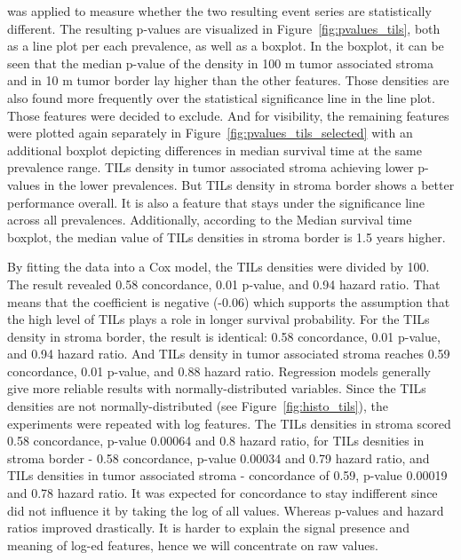 was applied to measure whether the two resulting event series are statistically different.
The resulting p-values are visualized in Figure~\ref{fig:pvalues_tils}, both as a line plot
per each prevalence, as well as a boxplot. In the boxplot, it can be seen that the median
p-value of the density in 100 \textmu m tumor associated stroma and in 10 \textmu m tumor
border lay higher than the other features. Those densities are also found more frequently
over the statistical significance line in the line plot. Those features were decided to exclude.
And for visibility, the remaining features were plotted again separately in
Figure~\ref{fig:pvalues_tils_selected} with an additional boxplot depicting differences in median
survival time at the same prevalence range. TILs density in tumor associated stroma achieving
lower p-values in the lower prevalences. But TILs density in stroma border shows a better
performance overall. It is also a feature that stays under the significance line across
all prevalences. Additionally, according to the Median survival time boxplot,
the median value of TILs densities in stroma border is 1.5 years higher.

By fitting the data into a Cox model, the TILs densities were divided by 100.
The result revealed 0.58 concordance, 0.01 p-value, and 0.94 hazard ratio.
That means that the coefficient is negative (-0.06) which supports the assumption
that the high level of TILs plays a role in longer survival probability.
For the TILs density in stroma border, the result is identical: 0.58 concordance,
0.01 p-value, and 0.94 hazard ratio. And TILs density in tumor associated stroma
reaches 0.59 concordance, 0.01 p-value, and 0.88 hazard ratio.
Regression models generally give more reliable results with normally-distributed variables.
Since the TILs densities are not normally-distributed (see Figure~\ref{fig:histo_tils}),
the experiments were repeated with log features. The TILs densities in stroma scored
0.58 concordance, p-value 0.00064 and 0.8 hazard ratio, for TILs desnities in stroma border - 0.58
concordance, p-value 0.00034 and 0.79 hazard ratio, and TILs densities in tumor
associated stroma - concordance of 0.59, p-value 0.00019 and 0.78 hazard ratio.
It was expected for concordance to stay indifferent since did not influence it by
taking the log of all values. Whereas p-values and hazard ratios improved drastically.
It is harder to explain the signal presence and meaning of log-ed features,
hence we will concentrate on raw values.

